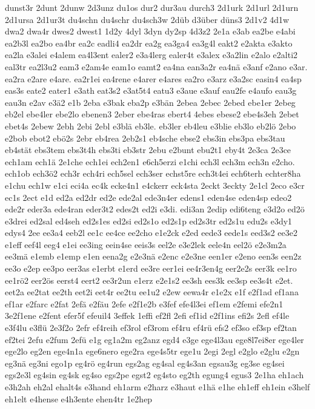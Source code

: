 {dunst3r
2dunt
2dunw
2d3unz
du1os
dur2
dur3au
durch3
2d1urk
2d1url
2d1urn
2d1ursa
2d1ur3t
du4schn
du4schr
du4sch3w
2düb
d3über
düns3
2d1v2
4d1w
dwa2
dwa4r
dwes2
dwest1
1d2y
4dyl
3dyn
dy2sp
4d3z2
2e1a
e3ab
ea2be
e4abi
ea2b3l
ea2bo
ea4br
ea2c
eadli4
ea2dr
ea2g
ea3ga4
ea3g4l
eakt2
e2akta
e3akto
ea2la
e3alei
e4alem
ea4l3ent
ealer2
e3a4lerg
ealer4t
e3alex
e3a2lin
e2alo
e2alti2
eal3tr
ea2l3u2
eam3
e2am4e
eam1o
eamt2
ea4na
ean3a2r
ea4nä
e3anf
e2ano
e3ar.
ea2ra
e2are
e4are.
ea2r1ei
ea4rene
e4arer
e4ares
ea2ro
e3arz
e3a2sc
easin4
ea4sp
eas3s
eate2
eater1
e3ath
eat3s2
e3at5t4
eatu3
e3aue
e3auf
eau2fe
e4aufo
eau3g
eau3n
e2av
e3ä2
e1b
2eba
e3bak
eba2p
e3bän
2ebea
2ebec
2ebed
ebe1er
2ebeg
eb2el
ebe4ler
ebe2lo
ebenen3
2eber
ebe4ras
ebert4
4ebes
ebese2
ebe4s3eh
2ebet
ebet4s
2ebew
2ebh
2ebi
2ebl
e3blä
eb3le.
eb3ler
eb4leu
e3blie
eb3lo
eb2lö
2ebo
e2bob
ebot2
ebö2s
2ebr
eb4rea
2eb2s1
eb4sche
ebse2
ebs3in
ebs3pa
ebs3tau
eb4stät
ebs3tem
ebs3t4h
ebs3ti
eb3str
2ebu
e2bunt
ebu2t1
eby4t
2e3ca
2e3ce
ech1am
ech1ä
2e1che
ech1ei
ech2en1
e6ch5erzi
e1chi
ech3l
ech3m
ech3n
e2cho.
ech1ob
ech3ö2
ech3r
ech4ri
ech5sel
ech3ser
echst5re
ech3t4ei
ech6terh
echter8ha
e1chu
ech1w
e1ci
eci4a
ec4k
ecke4n1
e4ckerr
eck4sta
2eckt
3eckty
2e1cl
2eco
e3cr
ec1s
2ect
e1d
ed2a
ed2dr
ed2e
ede2al
ede3n4er
edens1
eden4se
eden4sp
edeo2
ede2r
eder3a
ede4ran
eder3t2
edes2t
ed2i
e3di.
edi3an
2edip
edi6teng
e3d2o
ed2ö
e3drei
ed2sal
ed4seh
ed2s1es
ed2si
ed2s1o
ed2s1p
ed2s3tr
ed2s1u
edu2s
e3dy1
edys4
2ee
ee3a4
eeb2l
ee1c
ee4ce
ee2cho
e1e2ck
e2ed
eede3
eede1s
eed3s2
ee3e2
e1eff
eef4l
eeg4
e1ei
ee3ing
eein4se
eeis3s
eel2e
e3e2lek
eele4n
eel2ö
e2e3m2a
ee3mä
e1emb
e1emp
e1en
eena2g
e2e3nä
e2enc
e2e3ne
een1er
e2eno
een3s
een2z
ee3o
e2ep
ee3po
eer3as
e1erbt
e1erd
ee3re
eer1ei
ee4r3en4g
eer2e2s
eer3k
ee1ro
ee1rö2
eer2ös
eerst4
eert2
ee3r2un
e1erz
e2e1s2
ee3sh
ees3k
ee3sp
ee3s4t
e2et.
eet2a
ee2tat
ee2th
eet2i
eet4r
ee2tu
ee1u2
e2ew
eewa4r
e1e2x
e1f
e2f1ad
ef1ana
ef1ar
e2farc
e2fat
2efä
e2fäu
2efe
e2f1e2b
e3fef
efe4l3ei
ef1em
e2femi
efe2n1
3e2f1ene
e2fent
efer5f
efeuil4
3effek
1effi
ef2fl
2efi
ef1id
e2f1ins
efi2s
2efl
ef4le
e3f4lu
e3flü
2e3f2o
2efr
ef4reih
ef3rol
ef3rom
ef4ru
ef4rü
efs2
ef3so
ef3sp
ef2tan
ef2tei
2efu
e2fum
2efü
e1g
eg1a2m
eg2anz
egd4
e3ge
ege4l3au
ege8l7ei8er
ege4ler
ege2lo
eg2en
ege4n1a
ege6nero
ege2ra
ege4s5tr
ege1u
2egi
2egl
e2glo
e2glu
e2gn
eg3nä
eg3ni
ego1p
eg4rö
eg4run
egs2ag
eg4sal
eg4s3an
egsau3g
eg3se
eg4sei
egs2e3l
eg4sin
eg4sk
eg4so
egs2pe
egst2
eg4sto
eg2th
egung4
egus3
2e1ha
eh1ach
e3h2ah
eh2al
ehalt4s
e3hand
eh1arm
e2harz
e3haut
e1hä
e1he
eh1eff
eh1ein
e3helf
eh1elt
e4hense
e4h3ente
ehen4tr
1e2hep
}
